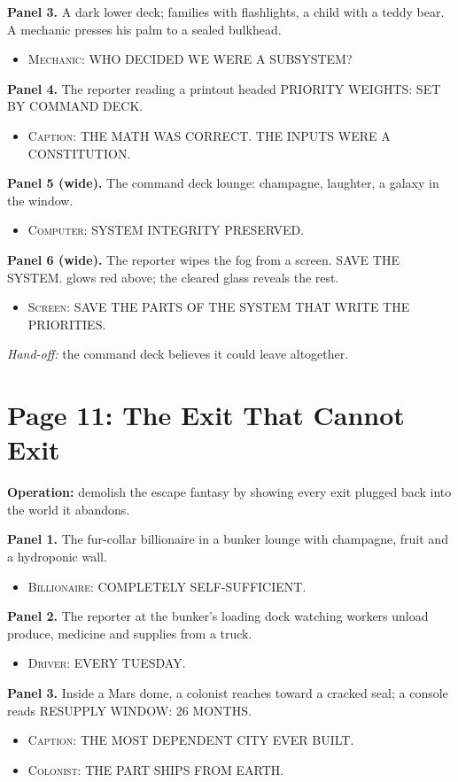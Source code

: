 \documentclass[11pt]{article}
\newcommand{\op}[1]{\textbf{Operation:} #1\par}
\newcommand{\panel}[2]{\textbf{#1.} #2\par}
\newenvironment{lines}{\begin{itemize}[label={},leftmargin=1.5em,itemsep=0.05em,topsep=0.1em]}{\end{itemize}}
\newcommand{\say}[2]{\item \textsc{#1}: \textsf{\small #2}}
\newcommand{\handoff}[1]{\emph{Hand-off:} #1\par}
\begin{document}
\panel{Panel 3}{A dark lower deck; families with flashlights, a child with a teddy bear. A mechanic presses his palm to a sealed bulkhead.}
\begin{lines}\say{Mechanic}{WHO DECIDED WE WERE A SUBSYSTEM?}\end{lines}

\panel{Panel 4}{The reporter reading a printout headed \textsf{\small PRIORITY WEIGHTS: SET BY COMMAND DECK}.}
\begin{lines}\say{Caption}{THE MATH WAS CORRECT. THE INPUTS WERE A CONSTITUTION.}\end{lines}

\panel{Panel 5 (wide)}{The command deck lounge: champagne, laughter, a galaxy in the window.}
\begin{lines}\say{Computer}{SYSTEM INTEGRITY PRESERVED.}\end{lines}

\panel{Panel 6 (wide)}{The reporter wipes the fog from a screen. \textsf{\small SAVE THE SYSTEM.} glows red above; the cleared glass reveals the rest.}
\begin{lines}\say{Screen}{SAVE THE PARTS OF THE SYSTEM THAT WRITE THE PRIORITIES.}\end{lines}

\handoff{the command deck believes it could leave altogether.}

\section{Page 11: The Exit That Cannot Exit}

\op{demolish the escape fantasy by showing every exit plugged back into the world it abandons.}

\panel{Panel 1}{The fur-collar billionaire in a bunker lounge with champagne, fruit and a hydroponic wall.}
\begin{lines}\say{Billionaire}{COMPLETELY SELF-SUFFICIENT.}\end{lines}

\panel{Panel 2}{The reporter at the bunker's loading dock watching workers unload produce, medicine and supplies from a truck.}
\begin{lines}\say{Driver}{EVERY TUESDAY.}\end{lines}

\panel{Panel 3}{Inside a Mars dome, a colonist reaches toward a cracked seal; a console reads \textsf{\small RESUPPLY WINDOW: 26 MONTHS}.}
\begin{lines}\say{Caption}{THE MOST DEPENDENT CITY EVER BUILT.}\say{Colonist}{THE PART SHIPS FROM EARTH.}\end{lines}
\end{document}
